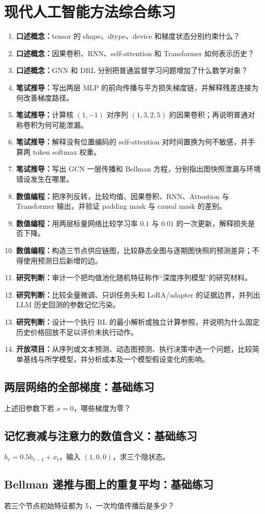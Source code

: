 \section{现代人工智能方法综合练习}
\begin{enumerate}[leftmargin=*]
  \item \textbf{口述概念：}tensor 的 shape、dtype、device 和梯度状态分别约束什么？
  \item \textbf{口述概念：}因果卷积、RNN、self-attention 和 Transformer 如何表示历史？
  \item \textbf{口述概念：}GNN 和 DRL 分别把普通监督学习问题增加了什么数学对象？
  \item \textbf{笔试推导：}写出两层 MLP 的前向传播与平方损失梯度链，并解释残差连接为何改善梯度路径。
  \item \textbf{笔试推导：}计算核 $(1,-1)$ 对序列 $(1,3,2,5)$ 的因果卷积；再说明普通对称卷积为何可能泄漏。
  \item \textbf{笔试推导：}解释没有位置编码的 self-attention 对时间置换为何不敏感，并手算两 token softmax 权重。
  \item \textbf{笔试推导：}写出 GCN 一层传播和 Bellman 方程，分别指出图快照泄漏与环境错设发生在哪里。
  \item \textbf{数值编程：}把序列反转，比较均值、因果卷积、RNN、Attention 与 Transformer 输出，并验证 padding mask 与 causal mask 的差别。

  \item \textbf{数值编程：}用两层标量网络比较学习率 $0.1$ 与 $0.01$ 的一次更新，解释损失是否下降。
  \item \textbf{数值编程：}构造三节点供应链图，比较静态全图与逐期图快照的预测差异；不得使用预测日后新增的边。
  \item \textbf{研究判断：}审计一个把均值池化随机特征称作“深度序列模型”的研究材料。
  \item \textbf{研究判断：}比较全量微调、只训任务头和 LoRA/adapter 的证据边界，并列出 LLM 历史回测的参数记忆污染。
  \item \textbf{研究判断：}设计一个执行 RL 的最小解析或独立计算参照，并说明为什么固定历史价格回放不足以评价未执行动作。
  \item \textbf{开放项目：}从序列或文本预测、动态图预测、执行决策中选一个问题，比较简单基线与所学模型，并分析成本及一个模型假设变化的影响。
\end{enumerate}

\subsection*{两层网络的全部梯度：基础练习}
上述旧参数下若 $x=0$，哪些梯度为零？

\subsection*{记忆衰减与注意力的数值含义：基础练习}
$h_t=0.5h_{t-1}+x_t$，输入 $(1,0,0)$，求三个隐状态。

\subsection*{Bellman 递推与图上的重复平均：基础练习}
若三个节点初始特征都为 5，一次均值传播后是多少？
